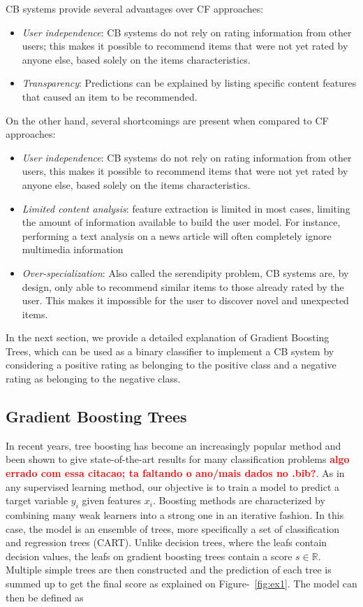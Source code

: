\documentclass[cic,tc,english]{iiufrgs}
\newcommand{\bruno}[1]{\textcolor{red}{\textbf{#1}}}
\begin{document}
CB systems provide several advantages over CF approaches:
\begin{itemize}
\item \emph{User independence}: CB systems do not rely on rating information from other users; this makes it possible to recommend items that were not yet rated by anyone else, based solely on the items characteristics. 
\item \emph{Transparency}: Predictions can be explained by listing specific content features that caused an item to be recommended.
\end{itemize}
On the other hand, several shortcomings are present when compared to CF approaches:
\begin{itemize}
\item \emph{User independence}: CB systems do not rely on rating information from other users, this makes it possible to recommend items that were not yet rated by anyone else, based solely on the items characteristics. 
\item \emph{Limited content analysis}: feature extraction is limited in most cases, limiting the amount of information available to build the user model. For instance, performing a text analysis on a news article will often completely ignore multimedia information
\item \emph{Over-specialization}: Also called the serendipity problem, CB systems are, by design, only able to recommend similar items to those already rated by the user. This makes it impossible for the user to discover novel and unexpected items.
\end{itemize}

In the next section, we provide a detailed explanation of Gradient Boosting Trees, which can be used as a binary classifier to implement a CB system by considering a positive rating as belonging to the positive class and a negative rating as belonging to the negative class.

\subsection{Gradient Boosting Trees}
In recent years, tree boosting has become an increasingly popular method and been shown to give state-of-the-art results for many classification problems \cite{Li2012} \bruno{algo errado com essa citacao; ta faltando o ano/mais dados no .bib?}. As in any supervised learning method, our objective is to train a model to predict a target variable $y_i$ given features $x_i$. Boosting methods are characterized by combining many weak learners into a strong one in an iterative fashion. In this case, the model is an ensemble of trees, more specifically a set of classification and regression trees (CART). Unlike decision trees, where the leafs contain decision values, the leafs on gradient boosting trees contain a score $s \in \mathbb{R}$. Multiple simple trees are then constructed and the prediction of each tree is summed up to get the final score as explained on Figure-~\ref{fig:ex1}. The model can then be defined as
\end{document}
